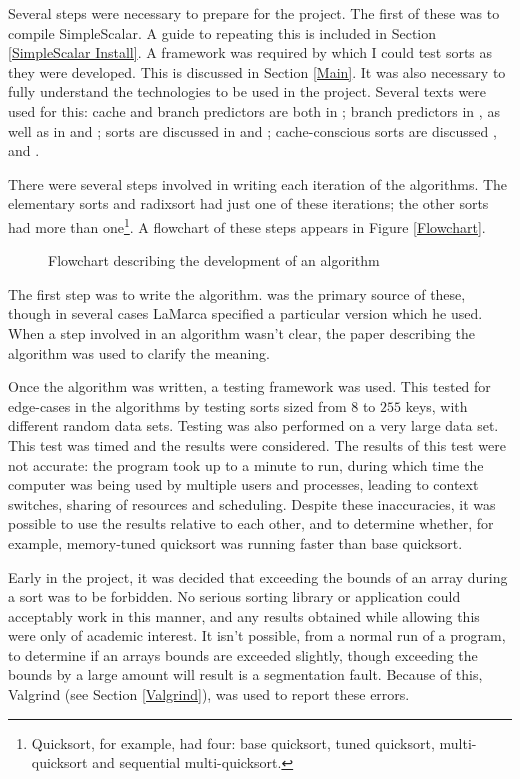 Several steps were necessary to prepare for the project. The first of these was
to compile SimpleScalar. A guide to repeating this is included in Section
\ref{SimpleScalar Install}. A framework was required by which I could test sorts
as they were developed. This is discussed in Section \ref{Main}. It was also necessary
to fully understand the technologies to be used in the project. Several texts
were used for this: cache and branch predictors are both in
\cite{HennessyPatterson90}; branch predictors in
\cite{Uht97}, as well as in \cite{McFarling93}
and \cite{Smith81}; sorts are discussed in \cite{Sedgewick02} and
\cite{Knuth98}; cache-conscious sorts are discussed \cite{LaMarca96},
\cite{LaMarca99} and \cite{LaMarcaHeap96}.

There were several steps involved in writing each iteration of the algorithms.
The elementary sorts and radixsort had just one of these iterations; the other sorts had more
than one\footnote{Quicksort, for example, had four: base quicksort, tuned
quicksort, multi-quicksort and sequential multi-quicksort.}. A flowchart of these
steps appears in Figure \vref{Flowchart}.

\begin{figure}
\caption{Flowchart describing the development of an algorithm}
\label{Flowchart}
\end{figure}


The first step was to write the algorithm. \cite{Sedgewick02} was the primary
source of these, though in several cases LaMarca specified a particular version
which he used. When a step involved in an algorithm wasn't clear, the paper
describing the algorithm was used to clarify the meaning.

Once the algorithm was written, a testing framework was used. This tested for
edge-cases in the algorithms by testing sorts sized from $8$ to $255$ keys, with
different random data sets. Testing was also performed on a very large data set.
This test was timed and the results were considered. The results of this test
were not accurate: the program took up to a minute to run, during which time the
computer was being used by multiple users and processes, leading to context
switches, sharing of resources and scheduling. Despite these inaccuracies, it was
possible to use the results relative to each other, and to determine whether,
for example, memory-tuned quicksort was running faster than base quicksort.

Early in the project, it was decided that exceeding the bounds of an array
during a sort was to be forbidden. No serious sorting library or application
could acceptably work in this manner, and any results obtained while allowing
this were only of academic interest. It isn't possible, from a normal run of a
program, to determine if an arrays bounds are exceeded slightly, though exceeding
the bounds by a large amount will result is a segmentation fault. Because of
this, Valgrind (see Section \ref{Valgrind}), was used to report these errors.

